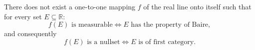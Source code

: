 There does not exist a one-to-one mapping $f$ of the real line onto itself such that for every set $E \subseteq \mathbb{R}$:
$$f(E) \text{ is measurable} \iff E \text{ has the property of Baire},$$
and consequently
$$f(E) \text{ is a nullset} \iff E \text{ is of first category}.$$
